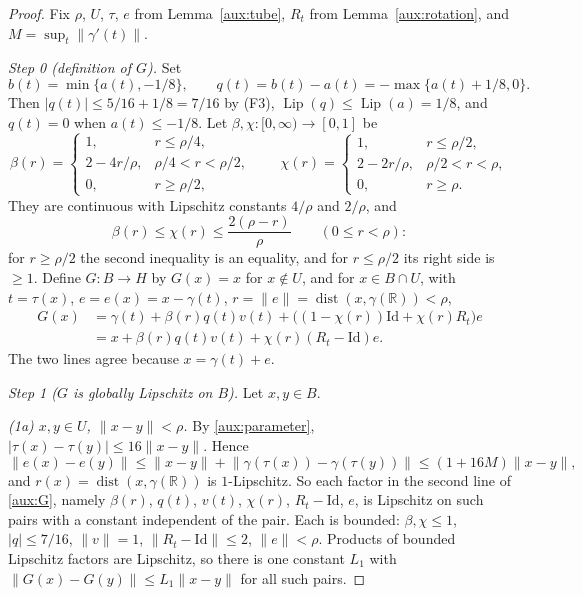 \documentclass[11pt]{article}
\newcommand{\R}{\mathbb R}
\newcommand{\norm}[1]{\lVert #1\rVert}
\DeclareMathOperator{\Lip}{Lip}
\DeclareMathOperator{\dist}{dist}
\theoremstyle{definition}
\numberwithin{equation}{section}
\begin{document}
\begin{proof}
Fix \(\rho\), \(U\), \(\tau\), \(e\) from Lemma~\ref{aux:tube}, \(R_t\)
from Lemma~\ref{aux:rotation}, and \(M=\sup_t\norm{\gamma'(t)}\).

\emph{Step 0 (definition of \(G\)).} Set
\[
 b(t)=\min\{a(t),-1/8\},\qquad
 q(t)=b(t)-a(t)=-\max\{a(t)+1/8,0\}.
\]
Then \(|q(t)|\le5/16+1/8=7/16\) by (F3), \(\Lip(q)\le\Lip(a)=1/8\), and
\(q(t)=0\) when \(a(t)\le-1/8\). Let
\(\beta,\chi:[0,\infty)\to[0,1]\) be
\[
 \beta(r)=
 \begin{cases}
 1,&r\le\rho/4,\\
 2-4r/\rho,&\rho/4<r<\rho/2,\\
 0,&r\ge\rho/2,
 \end{cases}
 \qquad
 \chi(r)=
 \begin{cases}
 1,&r\le\rho/2,\\
 2-2r/\rho,&\rho/2<r<\rho,\\
 0,&r\ge\rho.
 \end{cases}
\]
They are continuous with Lipschitz constants \(4/\rho\) and \(2/\rho\),
and
\begin{equation}\label{aux:cutoffs}
 \beta(r)\le\chi(r)\le\frac{2(\rho-r)}{\rho}\qquad(0\le r<\rho):
\end{equation}
for \(r\ge\rho/2\) the second inequality is an equality, and for
\(r\le\rho/2\) its right side is \(\ge1\).
Define \(G:B\to H\) by \(G(x)=x\) for \(x\notin U\), and for
\(x\in B\cap U\), with \(t=\tau(x)\), \(e=e(x)=x-\gamma(t)\),
\(r=\norm e=\dist(x,\gamma(\R))<\rho\),
\begin{equation}\label{aux:G}
 \begin{split}
 G(x)&=\gamma(t)+\beta(r)q(t)v(t)
       +\bigl((1-\chi(r))\mathrm{Id}+\chi(r)R_t\bigr)e\\
 &=x+\beta(r)q(t)v(t)+\chi(r)(R_t-\mathrm{Id})e .
 \end{split}
\end{equation}
The two lines agree because \(x=\gamma(t)+e\).

\emph{Step 1 (\(G\) is globally Lipschitz on \(B\)).} Let \(x,y\in B\).

\emph{(1a) \(x,y\in U\), \(\norm{x-y}<\rho\).} By \eqref{aux:parameter},
\(|\tau(x)-\tau(y)|\le16\norm{x-y}\). Hence
\[
 \norm{e(x)-e(y)}\le\norm{x-y}+\norm{\gamma(\tau(x))-\gamma(\tau(y))}
 \le(1+16M)\norm{x-y},
\]
and \(r(x)=\dist(x,\gamma(\R))\) is \(1\)-Lipschitz. So each factor in
the second line of \eqref{aux:G}, namely \(\beta(r)\), \(q(t)\), \(v(t)\),
\(\chi(r)\), \(R_t-\mathrm{Id}\), \(e\), is Lipschitz on such pairs with
a constant independent of the pair. Each is bounded: \(\beta,\chi\le1\),
\(|q|\le7/16\), \(\norm v=1\), \(\norm{R_t-\mathrm{Id}}\le2\),
\(\norm e<\rho\). Products of bounded Lipschitz factors are Lipschitz, so
there is one constant \(L_1\) with
\(\norm{G(x)-G(y)}\le L_1\norm{x-y}\) for all such pairs.


\end{proof}
\end{document}

